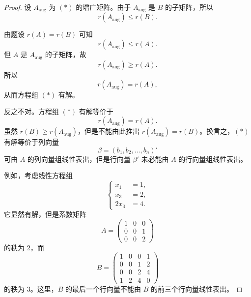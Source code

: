\begin{proof}
	设 $A_{\mathrm{aug}}$ 为 $(*)$ 的增广矩阵。由于 $A_{\mathrm{aug}}$ 是 $B$ 的子矩阵，所以
	\[
	r(A_{\mathrm{aug}})\leq r(B).
	\]
	
	由题设 $r(A)=r(B)$ 可知
	\[
	r(A_{\mathrm{aug}})\leq r(A).
	\]
	但 $A$ 是 $A_{\mathrm{aug}}$ 的子矩阵，故
	\[
	r(A_{\mathrm{aug}})\geq r(A).
	\]
	所以
	\[
	r(A_{\mathrm{aug}})=r(A),
	\]
	从而方程组 $(*)$ 有解。
	
	反之不对。方程组 $(*)$ 有解等价于
	\[
	r(A_{\mathrm{aug}})=r(A).
	\]
	虽然 $r(B)\geq r(A_{\mathrm{aug}})$，但是不能由此推出
	$r(A_{\mathrm{aug}})=r(B)$。换言之，$(*)$ 有解等价于列向量
	\[
	\beta=(b_1,b_2,\ldots,b_n)'
	\]
	可由 $A$ 的列向量组线性表出，但是行向量 $\beta'$ 未必能由 $A$ 的行向量组线性表出。
	
	例如，考虑线性方程组
	\[
	\left\{
	\begin{aligned}
		x_1&=1,\\
		x_3&=2,\\
		2x_3&=4.
	\end{aligned}
	\right.
	\]
	它显然有解，但是系数矩阵
	\[
	A=
	\begin{pmatrix}
		1&0&0\\
		0&0&1\\
		0&0&2
	\end{pmatrix}
	\]
	的秩为 $2$，而
	\[
	B=
	\begin{pmatrix}
		1&0&0&1\\
		0&0&1&2\\
		0&0&2&4\\
		1&2&4&0
	\end{pmatrix}
	\]
	的秩为 $3$。这里，$B$ 的最后一个行向量不能由 $B$ 的前三个行向量线性表出。
\end{proof}










































































